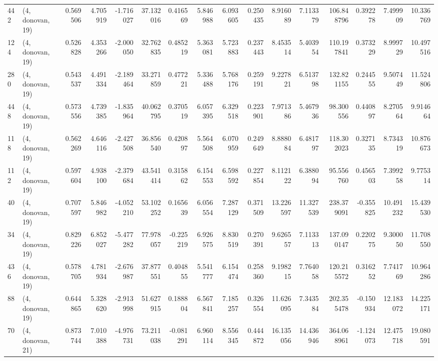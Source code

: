 \begin{tabular}{llrrrrrrrrrrrrrr}
442 &  (4, donovan, 19) &   0.569506 &   4.705919 &  -1.716027 &    37.132016 &   0.416569 &   5.846988 &   6.093605 &  0.250435 &   8.916089 &   7.113379 &   106.848796 &   0.392278 &   7.499909 &  10.336769 \\
124 &  (4, donovan, 19) &   0.526828 &   4.353266 &  -2.000050 &    32.762835 &   0.485219 &   5.363081 &   5.723883 &  0.237443 &   8.453514 &   5.403954 &   110.197841 &   0.373229 &   8.999729 &  10.497516 \\
280 &  (4, donovan, 19) &   0.543537 &   4.491334 &  -2.189464 &    33.271859 &   0.477221 &   5.336488 &   5.768176 &  0.259191 &   9.227821 &   6.513798 &   132.821155 &   0.244555 &   9.507449 &  11.524806 \\
448 &  (4, donovan, 19) &   0.573556 &   4.739385 &  -1.835964 &    40.062795 &   0.370519 &   6.057395 &   6.329518 &  0.223901 &   7.971386 &   5.467936 &    98.300556 &   0.440897 &   8.270564 &   9.914664 \\
118 &  (4, donovan, 19) &   0.562269 &   4.646116 &  -2.427508 &    36.856540 &   0.420897 &   5.564508 &   6.070959 &  0.249649 &   8.888084 &   6.481797 &   118.302023 &   0.327135 &   8.734319 &  10.876673 \\
112 &  (4, donovan, 19) &   0.597604 &   4.938100 &  -2.379684 &    43.541414 &   0.315862 &   6.154553 &   6.598592 &  0.227854 &   8.112122 &   6.388094 &    95.556760 &   0.456503 &   7.399258 &   9.775314 \\
40  &  (4, donovan, 19) &   0.707597 &   5.846982 &  -4.052210 &    53.102252 &   0.165639 &   6.056554 &   7.287129 &  0.371509 &  13.226597 &  11.327539 &   238.379091 &  -0.355825 &  10.491232 &  15.439530 \\
34  &  (4, donovan, 19) &   0.829226 &   6.852027 &  -5.477282 &    77.978057 &  -0.225219 &   6.926575 &   8.830519 &  0.270391 &   9.626557 &   7.113313 &   137.090147 &   0.220275 &   9.300050 &  11.708550 \\
436 &  (4, donovan, 19) &   0.578705 &   4.781934 &  -2.676987 &    37.877551 &   0.404855 &   5.541777 &   6.154474 &  0.258360 &   9.198215 &   7.764058 &   120.215572 &   0.316252 &   7.741769 &  10.964286 \\
88  &  (4, donovan, 19) &   0.644865 &   5.328620 &  -2.913998 &    51.627915 &   0.188804 &   6.567841 &   7.185257 &  0.326554 &  11.626095 &   7.343584 &   202.355478 &  -0.150934 &  12.183072 &  14.225171 \\
70  &  (4, donovan, 21) &   0.873744 &   7.010388 &  -4.976731 &    73.211038 &  -0.081291 &   6.960114 &   8.556345 &  0.444872 &  16.135056 &  14.436946 &   364.068961 &  -1.124073 &  12.475718 &  19.080591 \\

\end{tabular}
